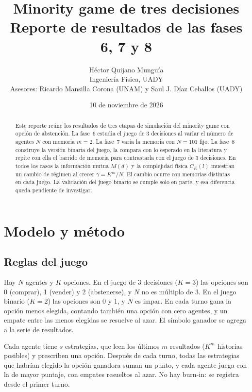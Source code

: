 \documentclass[11pt,letterpaper]{article}
\title{\textbf{Minority game de tres decisiones}\\[0.3em]
\large Reporte de resultados de las fases 6, 7 y 8}
\author{Héctor Quijano Munguía\\[0.2em]
\small Ingeniería Física, UADY\\
\small Asesores: Ricardo Mansilla Corona (UNAM) y Saul J. Díaz Ceballos (UADY)}
\date{10 de noviembre de 2026}
\begin{document}
\maketitle

\begin{abstract}
Este reporte reúne los resultados de tres etapas de simulación del minority game con opción de abstención. La fase~6 estudia el juego de 3 decisiones al variar el número de agentes $N$ con memoria $m=2$. La fase~7 varía la memoria con $N=101$ fijo. La fase~8 construye la versión binaria del juego, la compara con lo esperado en la literatura y repite con ella el barrido de memoria para contrastarla con el juego de 3 decisiones. En todos los casos la información mutua $M(d)$ y la complejidad física $C_K(l)$ muestran un cambio de régimen al crecer $\gamma=K^m/N$. El cambio ocurre con memorias distintas en cada juego. La validación del juego binario se cumple solo en parte, y esa diferencia queda pendiente de investigar.
\end{abstract}

\tableofcontents
\newpage

\section{Modelo y método}

\subsection{Reglas del juego}
Hay $N$ agentes y $K$ opciones. En el juego de 3 decisiones ($K=3$) las opciones son 0 (comprar), 1 (vender) y 2 (abstenerse), y $N$ no es múltiplo de 3. En el juego binario ($K=2$) las opciones son 0 y 1, y $N$ es impar. En cada turno gana la opción menos elegida, contando también una opción con cero agentes, y un empate entre las menos elegidas se resuelve al azar. El símbolo ganador se agrega a la serie de resultados.

Cada agente tiene $s$ estrategias, que leen los últimos $m$ resultados ($K^m$ historias posibles) y prescriben una opción. Después de cada turno, todas las estrategias que habrían elegido la opción ganadora suman un punto, y cada agente juega con la de mayor puntaje, con empates resueltos al azar. No hay burn-in: se registra desde el primer turno.
\end{document}
